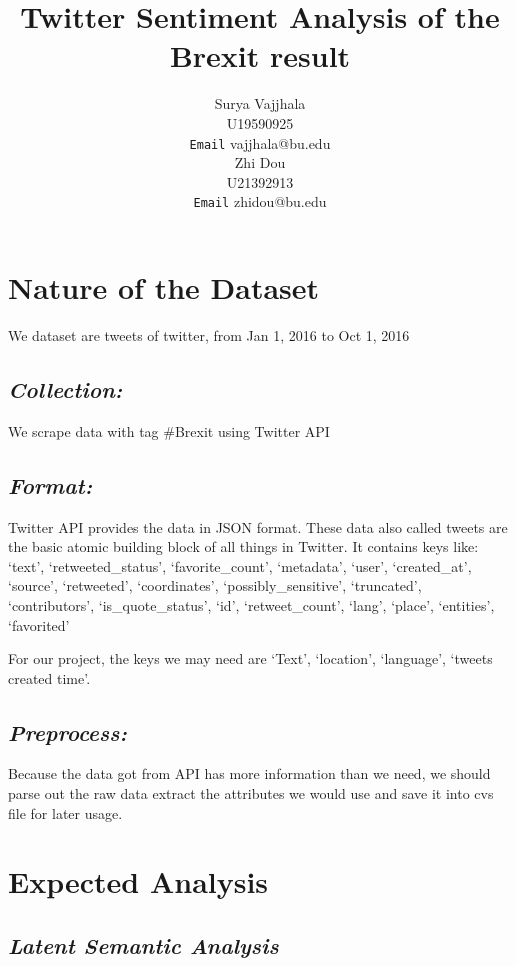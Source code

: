 \documentclass{article}
\title{Twitter Sentiment Analysis of the Brexit result}
\author{
    Surya Vajjhala \\
    U19590925\\
    \texttt{Email} vajjhala@bu.edu\\
     \And
    Zhi Dou \\
    U21392913 \\
    \texttt{Email} zhidou@bu.edu\\
}
\begin{document}

\maketitle

\section*{Nature of the Dataset}
We dataset are tweets of twitter, from Jan 1, 2016 to Oct 1, 2016

\subsection*{\textit{\textbf{Collection:}}}
We scrape data with tag \#Brexit using Twitter API 
\subsection*{\textit{\textbf{Format:}}} Twitter API provides the data in JSON format. These data also called tweets are the basic atomic building block of all things in Twitter. It contains keys like: \lq text\rq, \lq retweeted\_status\rq, \lq favorite\_count\rq, \lq metadata\rq, \lq user\rq, \lq created\_at\rq, \lq source\rq, \lq retweeted\rq, \lq coordinates\rq, \lq possibly\_sensitive\rq, \lq truncated\rq, \lq contributors\rq, \lq is\_quote\_status\rq, \lq id\rq, \lq retweet\_count\rq, \lq lang\rq, \lq place\rq , \lq entities\rq , \lq favorited\rq	

\par For our project, the keys we may need are \lq Text\rq, \lq location\rq, \lq language\rq, \lq tweets created time\rq.

\subsection*{\textit{\textbf{Preprocess:}}} Because the data got from API has more information than we need, we should parse out the raw data extract the attributes we would use and save it into cvs file for later usage.


\section*{Expected Analysis}

\subsection* {\textit{\textbf{Latent Semantic Analysis}}}
\end{document}
